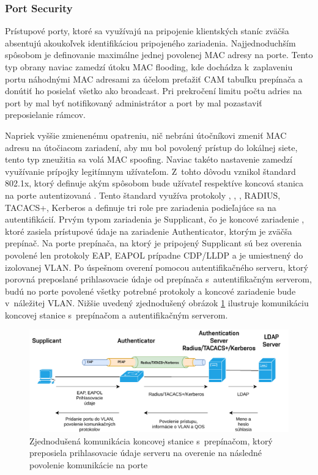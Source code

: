 \subsubsection{Port Security}
Prístupové porty, ktoré sa využívajú na pripojenie klientských staníc zväčša absentujú akoukoľvek identifikáciou pripojeného zariadenia. Najjednoduchším spôsobom je definovanie maximálne jednej povolenej MAC adresy na porte. Tento typ obrany naviac zamedzí útoku MAC flooding, kde dochádza k~zaplaveniu portu náhodnými MAC adresami za účelom preťažiť CAM tabuľku prepínača a donútiť ho posielať všetko ako broadcast. Pri prekročení limitu počtu adries na port by mal byť notifikovaný administrátor a port by mal pozastaviť preposielanie rámcov.

Napriek vyššie zmienenému opatreniu, nič nebráni útočníkovi zmeniť MAC adresu na útočiacom zariadení, aby mu bol povolený prístup do lokálnej siete, tento typ zneužitia sa volá MAC spoofing. Naviac takéto nastavenie zamedzí využívanie prípojky legitímnym užívateľom. Z~tohto dôvodu vznikol štandard 802.1x, ktorý definuje akým spôsobom bude užívateľ respektíve koncová stanica na porte autentizovaná \cite{Vyncke2008}. Tento štandard využíva protokoly , , , RADIUS, TACACS+, Kerberos a definuje tri role pre zariadenia podieľajúce sa na autentifikácií. Prvým typom zariadenia je Supplicant, čo je koncové zariadenie , ktoré zasiela prístupové údaje na zariadenie Authenticator, ktorým je zväčša prepínač. Na porte prepínača, na ktorý je pripojený Supplicant sú bez overenia povolené len protokoly EAP, EAPOL prípadne CDP/LLDP a je umiestnený do izolovanej VLAN. Po úspešnom overení pomocou autentifikačného serveru, ktorý porovná preposlané prihlasovacie údaje od prepínača s~autentifikačným serverom, budú no porte povolené všetky potrebné protokoly a koncové zariadenie bude v~náležitej VLAN. Nižšie uvedený zjednodušený obrázok \ref{fig:dot1x} ilustruje komunikáciu koncovej stanice s~prepínačom a autentifikačným serverom.  

\begin{figure}[H]
	\begin{center}
		\includegraphics[scale=0.75]{obrazky/dot1x.pdf}
	\end{center}
	\caption[Autentifikácia 802.1x zjednodušene]{Zjednodušená komunikácia koncovej stanice s~prepínačom, ktorý preposiela prihlasovacie údaje serveru na overenie na následné povolenie komunikácie na porte \cite{Vyncke2008}}
	\label{fig:dot1x}
\end{figure}


